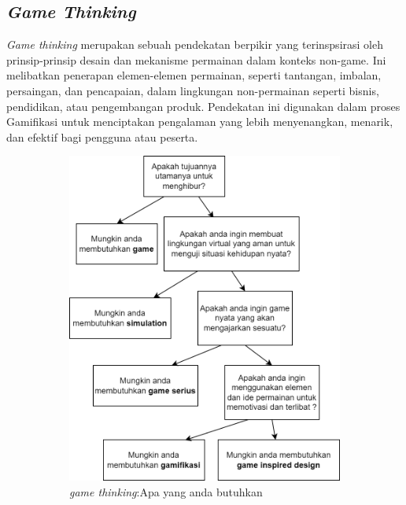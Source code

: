 \subsection{\textit{Game Thinking}}
\textit{Game thinking} merupakan sebuah pendekatan berpikir yang terinspsirasi oleh prinsip-prinsip desain dan mekanisme permainan dalam konteks non-game. 
Ini melibatkan penerapan elemen-elemen permainan, seperti tantangan, imbalan, persaingan, dan pencapaian, dalam lingkungan non-permainan seperti bisnis, pendidikan, atau pengembangan produk\cite{schell2008art}.
Pendekatan ini digunakan dalam proses Gamifikasi untuk menciptakan pengalaman yang lebih menyenangkan, menarik, dan efektif bagi pengguna atau peserta.
\begin{figure}[H]
	\centering
	\begin{subfigure}[b]{0.4\textwidth}
		\centering
	  \includegraphics[width=\linewidth]{contents/chapter-2/images/Game-thinking-2.png}
	  \caption{\textit{game thinking}:Apa yang anda butuhkan}
	  \label{fig:sub-gamethink-1}
	\end{subfigure}
	\hfill
	\begin{subfigure}[b]{0.4\textwidth}

\end{subfigure}
\end{figure}
